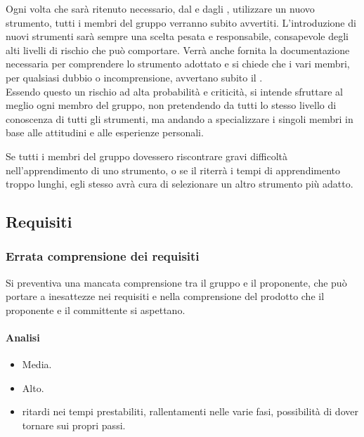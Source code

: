 \documentclass[a4paper, titlepage]{article}
\begin{document}
	Ogni volta che sarà ritenuto necessario, dal  e dagli , utilizzare un nuovo strumento, tutti i membri del gruppo verranno subito avvertiti. L'introduzione di nuovi strumenti sarà sempre una scelta pesata e responsabile, consapevole degli alti livelli di rischio che può comportare. Verrà anche fornita la documentazione necessaria per comprendere lo strumento adottato e si chiede che i vari membri, per qualsiasi dubbio o incomprensione, avvertano subito il .\\
	Essendo questo un rischio ad alta probabilità e criticità, si intende sfruttare al meglio ogni membro del gruppo, non pretendendo da tutti lo stesso livello di conoscenza di tutti gli strumenti, ma andando a specializzare i singoli membri in base alle attitudini e alle esperienze personali.
	
	Se tutti i membri del gruppo dovessero riscontrare gravi difficoltà nell'apprendimento di uno strumento, o se il  riterrà i tempi di apprendimento troppo lunghi, egli stesso avrà cura di selezionare un altro strumento più adatto.
	
	\subsection{Requisiti}
	\subsubsection{Errata comprensione dei requisiti}
	Si preventiva una mancata comprensione tra il gruppo e il proponente, che può portare a inesattezze nei requisiti e nella comprensione del prodotto che il proponente e il committente si aspettano.
	
	\paragraph{Analisi}
	\begin{itemize}
		\item {} Media.
		\item {} Alto.
		\item {} ritardi nei tempi prestabiliti, rallentamenti nelle varie fasi, possibilità di dover tornare sui propri passi.
	\end{itemize}
	
\end{document}
